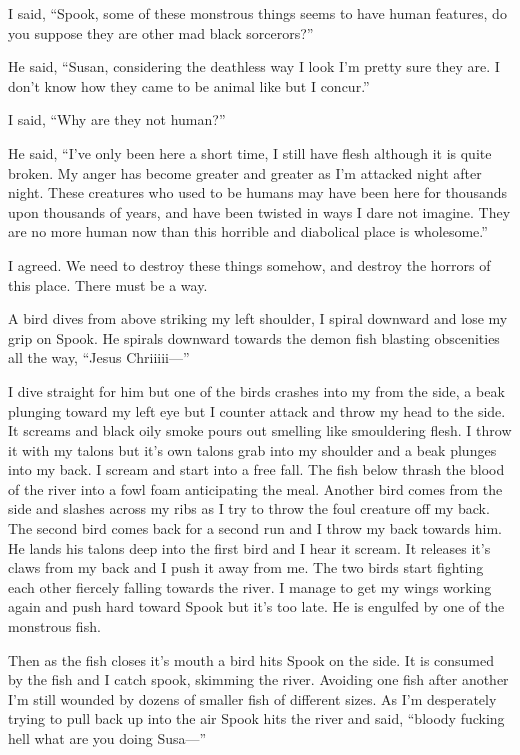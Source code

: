 I said, ``Spook, some of these monstrous things seems to have human features, do you suppose they are other mad black sorcerors?''

He said, ``Susan, considering the deathless way I look I'm pretty sure they are. I don't know how they came to be animal like but I concur.''

I said, ``Why are they not human?''

He said, ``I've only been here a short time, I still have flesh although it is quite broken. My anger has become greater and greater as I'm attacked night after night. These creatures who used to be humans may have been here for thousands upon thousands of years, and have been twisted in ways I dare not imagine. They are no more human now than this horrible and diabolical place is wholesome.''

I agreed. We need to destroy these things somehow, and destroy the horrors of this place. There must be a way.

A bird dives from above striking my left shoulder, I spiral downward and lose my grip on Spook. He spirals downward towards the demon fish blasting obscenities all the way, ``Jesus Chriiiii---''

I dive straight for him but one of the birds crashes into my from the side, a beak plunging toward my left eye but I counter attack and throw my head to the side. It screams and black oily smoke pours out smelling like smouldering flesh. I throw it with my talons but it's own talons grab into my shoulder and a beak plunges into my back. I scream and start into a free fall. The fish below thrash the blood of the river into a fowl foam anticipating the meal. Another bird comes from the side and slashes across my ribs as I try to throw the foul creature off my back. The second bird comes back for a second run and I throw my back towards him. He  lands his talons deep into the first bird and I hear it scream. It releases it's claws from my back and I push it away from me. The two birds start fighting each other fiercely falling towards the river. I manage to get my wings working again and push hard toward Spook but it's too late. He is engulfed by one of the monstrous fish.

Then as the fish closes it's mouth a bird hits Spook on the side. It is consumed by the fish and I catch spook, skimming the river. Avoiding one fish after another I'm still wounded by dozens of smaller fish of different sizes. As I'm desperately trying to pull back up into the air Spook hits the river and said, ``bloody fucking hell what are you doing Susa---''

